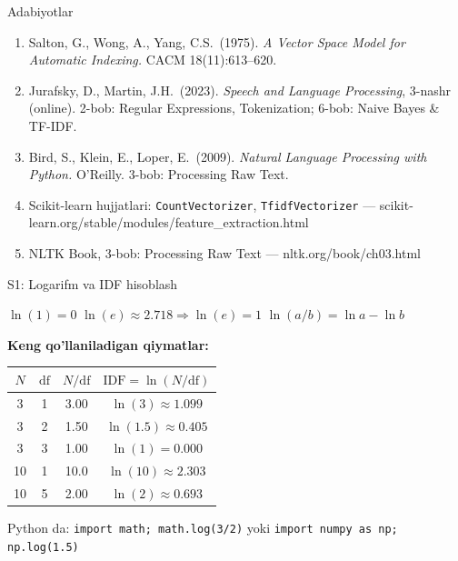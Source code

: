 \documentclass[aspectratio=169,11pt]{beamer}
\begin{document}
\begin{frame}{Adabiyotlar}
  \begin{enumerate}\small\setlength\itemsep{6pt}
    \item Salton, G., Wong, A., Yang, C.S.\ (1975).
          \textit{A Vector Space Model for Automatic Indexing.}
          CACM 18(11):613--620.
    \item Jurafsky, D., Martin, J.H.\ (2023).
          \textit{Speech and Language Processing}, 3-nashr (online).
          2-bob: Regular Expressions, Tokenization;
          6-bob: Naive Bayes \& TF-IDF.
    \item Bird, S., Klein, E., Loper, E.\ (2009).
          \textit{Natural Language Processing with Python.}
          O'Reilly. 3-bob: Processing Raw Text.
    \item Scikit-learn hujjatlari:
          \texttt{CountVectorizer}, \texttt{TfidfVectorizer} ---
          scikit-learn.org/stable/modules/feature\_extraction.html
    \item NLTK Book, 3-bob: Processing Raw Text ---
          nltk.org/book/ch03.html
  \end{enumerate}
\end{frame}

\appendix

\begin{frame}{S1: Logarifm va IDF hisoblash}
  \begin{tcolorbox}[defbox,title=Natural logarifm xossalari]
    \small
    $\ln(1) = 0$ \quad
    $\ln(e) \approx 2.718 \Rightarrow \ln(e)=1$ \quad
    $\ln(a/b) = \ln a - \ln b$
  \end{tcolorbox}
  \vspace{5pt}
  \textbf{Keng qo'llaniladigan qiymatlar:}
  \begin{center}\small
  \begin{tabular}{cccc}
    \toprule
    $N$ & $\mathrm{df}$ & $N/\mathrm{df}$ & $\mathrm{IDF} = \ln(N/\mathrm{df})$ \\
    \midrule
    3 & 1 & 3.00 & $\ln(3) \approx 1.099$ \\
    3 & 2 & 1.50 & $\ln(1.5) \approx 0.405$ \\
    3 & 3 & 1.00 & $\ln(1) = 0.000$ \\
    10 & 1 & 10.0 & $\ln(10) \approx 2.303$ \\
    10 & 5 & 2.00 & $\ln(2) \approx 0.693$ \\
    \bottomrule
  \end{tabular}
  \end{center}
  \vspace{4pt}
  \footnotesize
  Python da: \texttt{import math; math.log(3/2)} \quad yoki \quad
  \texttt{import numpy as np; np.log(1.5)}
\end{frame}
\end{document}
